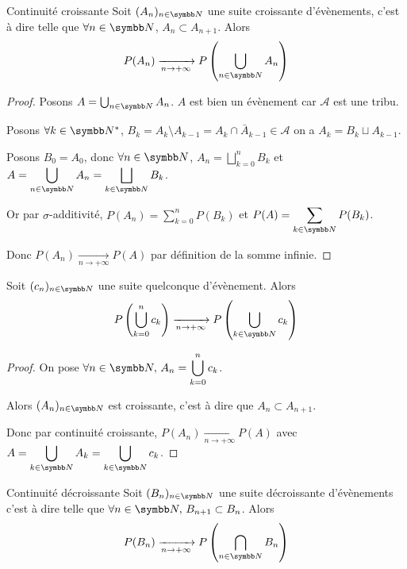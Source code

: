 \begin{theoreme}{Continuité croissante}{}
    Soit $(A_n)_{n \in \N}$ une suite croissante d'évènements, c'est à dire telle que $\forall n \in \N$, 
    $A_n \subset A_{n+1}$. Alors $$P(A_n) \xrightarrow[n \to + \infty]{} P\left( \bigcup_{n \in \N} A_n \right)$$
\end{theoreme}


\begin{proof}
    Posons $A = \bigcup_{n \in \N} A_n$. $A$ est bien un évènement car $\mathcal A$ est une tribu.

    Posons $\forall k \in \N^*$, $B_k = A_k \setminus A_{k-1} = A_k \cap \bar A_{k-1} \in \mathcal A$
    on a $A_k = B_k \sqcup A_{k - 1}$. 

    Posons $B_0 = A_0$, donc $\forall n \in \N$, $\displaystyle A_n = \bigsqcup_{k = 0}^n B_k$ 
    et $A = \displaystyle \bigcup_{n \in \N} A_n = \bigsqcup_{k \in \N} B_k$.

    Or par $\sigma$-additivité, $\displaystyle P(A_n) = \sum_{k = 0}^n P(B_k)$ et 
    $\displaystyle P(A) = \sum_{k \in \N} P(B_k)$.

    Donc $P(A_n) \xrightarrow[n \to + \infty]{} P(A)$ par définition de la somme infinie.
\end{proof}

\begin{proposition}{}{}
    Soit $(c_n)_{n \in \N}$ une suite quelconque d'évènement. Alors 
    $$P\left( \bigcup_{k = 0}^n c_k \right) \xrightarrow[n \to + \infty]{} P\left( \bigcup_{k \in \N} c_k \right)$$
\end{proposition}


\begin{proof}
    On pose $\forall n \in \N, \, \displaystyle A_n = \bigcup_{k = 0}^n c_k$. 

    Alors $(A_n)_{n \in \N}$ est croissante, c'est à dire que $A_n \subset A_{n + 1}$. 

    Donc par continuité croissante, $P(A_n) \xrightarrow[n \to + \infty]{} P(A)$
    avec $\displaystyle A = \bigcup_{k \in \N} A_k = \bigcup_{k \in \N} c_k$.
\end{proof}

\begin{theoreme}{Continuité décroissante}{}
    Soit $(B_n)_{n \in \N}$ une suite décroissante d'évènements c'est à dire telle que $\forall n \in \N, \, B_{n + 1} \subset B_n$.
    Alors $$\displaystyle P(B_n) \xrightarrow[n \to + \infty]{} P\left( \bigcap_{n \in \N} B_n \right)$$
\end{theoreme}

